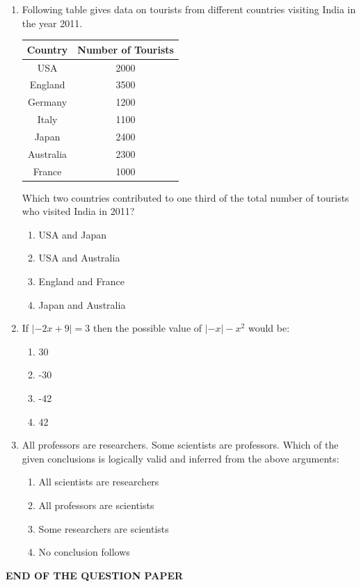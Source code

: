 \documentclass[journal,12pt,onecolumn]{IEEEtran}
\theoremstyle{remark}
\begin{document}
\begin{enumerate}[resume]
\item Following table gives data on tourists from different countries visiting India in the year 2011.

\begin{center}
\begin{tabular}{|c|c|}
\hline
Country & Number of Tourists \\
\hline
USA & 2000 \\
England & 3500 \\
Germany & 1200 \\
Italy & 1100 \\
Japan & 2400 \\
Australia & 2300 \\
France & 1000 \\
\hline
\end{tabular}
\end{center}

Which two countries contributed to one third of the total number of tourists who visited India in 2011?
\begin{enumerate}
    \item USA and Japan
    \item USA and Australia
    \item England and France
    \item Japan and Australia
\end{enumerate}
\hfill \textbf{}

\item If $|-2x + 9| = 3$ then the possible value of $|-x| - x^2$ would be:
\begin{enumerate}
    \item 30
    \item -30
    \item -42
    \item 42
\end{enumerate}
\hfill \textbf{}

\item All professors are researchers. Some scientists are professors. Which of the given conclusions is logically valid and inferred from the above arguments:
\begin{enumerate}
    \item All scientists are researchers
    \item All professors are scientists
    \item Some researchers are scientists
    \item No conclusion follows
\end{enumerate}
\hfill \textbf{}

\end{enumerate}

\begin{center}
    
\textbf{END OF THE QUESTION PAPER}
\end{center} 
\end{document}
